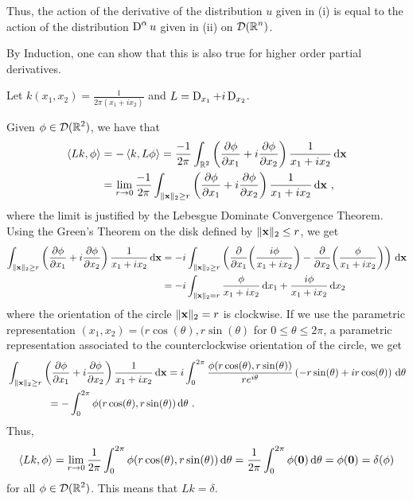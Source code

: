 \begin{egg}
Thus, the action of the derivative of the distribution $u$ given in
(i) is equal to the action of the distribution $\displaystyle \diff^\alpha u$
given in (ii) on $\displaystyle \DD(\RR^n)$.

By Induction, one can show that this is also true for higher order
partial derivatives.
\end{egg}

\begin{egg}
Let $\displaystyle k(x_1,x_2) = \frac{1}{2\pi(x_1 + i x_2)}$ and
$L = \diff_{x_1} + i \diff_{x_2}$.

Given $\displaystyle \phi \in \DD(\RR^2)$, we have that
\begin{align*}
\ps{L k}{\phi} &= - \ps{k}{L\phi}
= \frac{-1}{2\pi} \int_{\RR^2} \left( \pdydx{\phi}{x_1} + i
\pdydx{\phi}{x_2} \right) \frac{1}{x_1 + i x_2} \dx{\VEC{x}} \\
&= \lim_{r\to 0} \frac{-1}{2\pi} \int_{\|\VEC{x}\|_2\geq r}
\left( \pdydx{\phi}{x_1} + i \pdydx{\phi}{x_2} \right)
\frac{1}{x_1 + i x_2} \dx{\VEC{x}}  \ ,
\end{align*}
where the limit is justified by the Lebesgue Dominate Convergence
Theorem.  Using the Green's Theorem on the disk defined by
$\displaystyle \|\VEC{x}\|_2 \leq r$, we get
\begin{align*}
\int_{\|\VEC{x}\|_2\geq r}
\left( \pdydx{\phi}{x_1} + i \pdydx{\phi}{x_2} \right) \frac{1}{x_1 + i x_2}
\dx{\VEC{x}}
&= -i \int_{\|\VEC{x}\|_2\geq r}
\left( \pdfdx{\left(\frac{i \phi}{x_1 + i x_2}\right)}{x_1}
- \pdfdx{\left(\frac{\phi}{x_1 + i x_2}\right)}{x_2}  \right) \dx{\VEC{x}} \\
&= -i \int_{\|\VEC{x}\|_2 = r}
\frac{\phi}{x_1 + i x_2} \dx{x_1} + \frac{i\phi}{x_1 + i x_2} \dx{x_2}
\end{align*}
where the orientation of the circle $\|\VEC{x}\|_2 = r$
is clockwise.  If we use the parametric representation
$(x_1,x_2) = (r\cos(\theta),r\sin(\theta)$ for
$0 \leq \theta \leq 2\pi$, a parametric representation associated to
the counterclockwise orientation of the circle, we get
\begin{align*}
&\int_{\|\VEC{x}\|_2\geq r}
\left( \pdydx{\phi}{x_1} + i \pdydx{\phi}{x_2} \right)
\frac{1}{x_1 + i x_2} \dx{\VEC{x}} 
= i \int_0^{2\pi} \frac{\phi(r\cos(\theta),r\sin(\theta))}{r e^{i \theta}}
\left( -r \sin(\theta) + i r \cos(\theta) \right) \dx{\theta} \\
&\qquad \qquad
= - \int_0^{2\pi} \phi(r\cos(\theta),r\sin(\theta)) \dx{\theta} \ .
\end{align*}
Thus,
\[
\ps{L k}{\phi} = \lim_{r\to 0} \frac{1}{2\pi}
\int_0^{2\pi} \phi(r\cos(\theta),r\sin(\theta)) \dx{\theta}
= \frac{1}{2\pi} \int_0^{2\pi} \phi(\VEC{0}) \dx{\theta}
= \phi(\VEC{0}) = \delta(\phi)
\]
for all $\displaystyle \phi \in \DD(\RR^2)$.  This means that
$L k = \delta$.
\end{egg}

